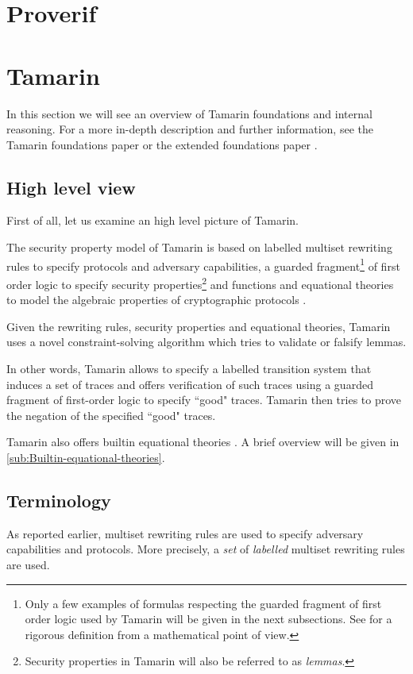 \section{Proverif}

\section{Tamarin}
In this section we will see an overview of Tamarin foundations and internal reasoning.
For a more in-depth description and further information, see the Tamarin foundations paper \cite{TamarinFoundations} or the extended foundations paper \cite{TamarinFoundationsExtended}.

\subsection{High level view}
First of all, let us examine an high level picture of Tamarin.

The security property model of Tamarin is based on labelled multiset rewriting rules to specify protocols and adversary capabilities, a guarded fragment\footnote{Only a few examples of formulas respecting the guarded fragment of first order logic used by Tamarin will be given in the next subsections. See \cite{FragmentFirstOrderLogicPaper} for a rigorous definition from a mathematical point of view.} of first order logic to specify security properties\footnote{Security properties in Tamarin will also be referred to as \textit{lemmas}.} and functions and equational theories to model the algebraic properties of cryptographic protocols \cite{TamarinFoundations}. %

Given the rewriting rules, security properties and equational theories, Tamarin uses a novel constraint-solving algorithm which tries to validate or falsify lemmas.

In other words, Tamarin allows to specify a labelled transition system that induces a set of traces and offers verification of such traces using a guarded fragment of first-order logic to specify ``good" traces. Tamarin then tries to prove the negation of the specified ``good" traces.

Tamarin also offers builtin equational theories \cite{TamarinProverManual}. A brief overview will be given in \cref{sub:Builtin-equational-theories}.

\subsection{Terminology}
As reported earlier, multiset rewriting rules are used to specify adversary capabilities and protocols. More precisely, a \textit{set} of \textit{labelled} multiset rewriting rules are used.

